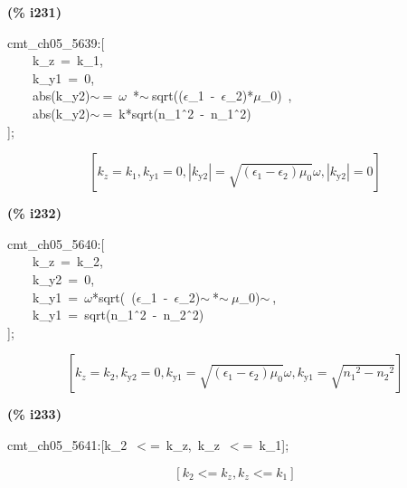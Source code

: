 \documentclass[fleqn]{article}
\begin{document}
\noindent
\begin{minipage}[t]{4.000000em}\color{red}\bfseries
(\% i231)	
\end{minipage}
\begin{minipage}[t]{\textwidth}\color{blue}
cmt\_ch05\_5639:[\\
\ \ \ \ k\_z\ =\ k\_1,\ \\
\ \ \ \ k\_y1\ =\ 0,\\
\ \ \ \ abs(k\_y2)\ensuremath{\sim\ }=\ \ensuremath{\omega}\ *\ensuremath{\sim\ }sqrt((\ensuremath{\epsilon}\_1\ -\ \ensuremath{\epsilon}\_2)*\ensuremath{\mu}\_0)\ ,\\
\ \ \ \ abs(k\_y2)\ensuremath{\sim\ }=\ k*sqrt(n\_1\^\ 2\ -\ n\_1\^\ 2)\\
];
\end{minipage}
\[\displaystyle \tag{\% o231} 
\left[ {k_z}={k_1}\operatorname{,}{k_{\ensuremath{\mathrm{y1}}}}=0\operatorname{,}\left| {k_{\ensuremath{\mathrm{y2}}}}\right| =\sqrt{\left( {{\epsilon }_1}-{{\epsilon }_2}\right)  {{\mu }_0}} \omega \operatorname{,}\left| {k_{\ensuremath{\mathrm{y2}}}}\right| =0\right] \mbox{}
\]


\noindent
\begin{minipage}[t]{4.000000em}\color{red}\bfseries
(\% i232)	
\end{minipage}
\begin{minipage}[t]{\textwidth}\color{blue}
cmt\_ch05\_5640:[\\
\ \ \ \ k\_z\ =\ k\_2,\ \\
\ \ \ \ k\_y2\ =\ 0,\\
\ \ \ \ k\_y1\ =\ \ensuremath{\omega}*sqrt(\ (\ensuremath{\epsilon}\_1\ -\ \ensuremath{\epsilon}\_2)\ensuremath{\sim\ }*\ensuremath{\sim\ }\ensuremath{\mu}\_0)\ensuremath{\sim\ },\\
\ \ \ \ k\_y1\ =\ sqrt(n\_1\^\ 2\ -\ n\_2\^\ 2)\\
];
\end{minipage}
\[\displaystyle \tag{\% o232} 
\left[ {k_z}={k_2}\operatorname{,}{k_{\ensuremath{\mathrm{y2}}}}=0\operatorname{,}{k_{\ensuremath{\mathrm{y1}}}}=\sqrt{\left( {{\epsilon }_1}-{{\epsilon }_2}\right)  {{\mu }_0}} \omega \operatorname{,}{k_{\ensuremath{\mathrm{y1}}}}=\sqrt{{{{n_1}}^{2}}-{{{n_2}}^{2}}}\right] \mbox{}
\]


\noindent
\begin{minipage}[t]{4.000000em}\color{red}\bfseries
(\% i233)	
\end{minipage}
\begin{minipage}[t]{\textwidth}\color{blue}
cmt\_ch05\_5641:[k\_2\ \ensuremath{<}=\ k\_z,\ k\_z\ \ensuremath{<}=\ k\_1];
\end{minipage}
\[\displaystyle \tag{\% o233} 
\left[ {k_2}\operatorname{<  =}{k_z}\operatorname{,}{k_z}\operatorname{<  =}{k_1}\right] \mbox{}
\]
\end{document}
